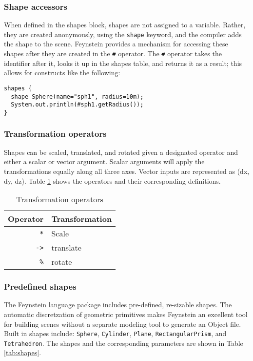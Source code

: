 \documentclass[letterpaper]{article}
\begin{document}
\subsubsection{Shape accessors}
When defined in the shapes block, shapes are not assigned to a
variable. Rather, they are created anonymously, using the
\texttt{shape} keyword, and the compiler adds the shape to the
scene. Feynstein provides a mechanism for accessing these shapes after
they are created in the \texttt{\#} operator. The \texttt{\#} operator
takes the identifier after it, looks it up in the shapes table, and
returns it as a result; this allows for constructs like the following:

\begin{verbatim}
shapes {
  shape Sphere(name="sph1", radius=10m);
  System.out.println(#sph1.getRadius());
}
\end{verbatim}

\subsubsection{Transformation operators}
Shapes can be scaled, translated, and rotated given a designated
operator and either a scalar or vector argument. Scalar arguments will
apply the transformations equally along all three axes. Vector inputs
are represented as (dx, dy, dz). Table \ref{tab:transform} shows the
operators and their corresponding definitions.

\begin{table}[h]\centering
  \begin{tabular}{r|l}
    Operator & Transformation \\ \hline
    \texttt{*} & Scale \\
    \texttt{->} & translate \\
    \texttt{\%} & rotate \\
  \end{tabular}
  \caption{Transformation operators}
  \label{tab:transform}
\end{table}

\subsubsection{Predefined shapes}
The Feynstein language package includes pre-defined, re-sizable
shapes. The automatic discretzation of geometric primitives makes
Feynstein an excellent tool for building scenes without a separate
modeling tool to generate an Object file.  Built in shapes include:
\texttt{Sphere}, \texttt{Cylinder}, \texttt{Plane},
\texttt{RectangularPrism}, and \texttt{Tetrahedron}. The shapes and
the corresponding parameters are shown in Table \ref{tab:shapes}.
\end{document}
